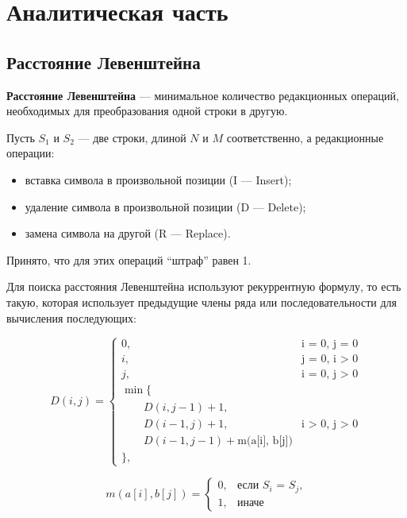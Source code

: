 \chapter{Аналитическая часть}

\section{Расстояние Левенштейна}
\textbf{Расстояние Левенштейна} --- минимальное количество редакционных операций, необходимых для преобразования одной строки в другую.\newline

Пусть $S_{1}$ и $S_{2}$ --- две строки, длиной $N$ и $M$ соответственно, а редакционные операции: %
\begin{itemize}
        \item вставка символа в произвольной позиции (I --- Insert);
        \item удаление символа в произвольной позиции (D --- Delete);
        \item замена символа на другой (R --- Replace). \newline
\end{itemize} 

Принято, что для этих операций ``штраф'' равен 1. \newline

Для поиска расстояния Левенштейна используют рекуррентную формулу, то есть такую, которая использует предыдущие члены ряда или последовательности для вычисления последующих:


\begin{equation}
	\label{eq:Lev}
	D(i, j) = \begin{cases}
		
		0, &\text{i = 0, j = 0}\\
		i, &\text{j = 0, i > 0}\\
		j, &\text{i = 0, j > 0}\\
		\min \lbrace \\
		\qquad D(i, j-1) + 1,\\
		\qquad D(i-1, j) + 1, &\text{i > 0, j > 0}\\
		\qquad D(i-1, j-1) + \text{m(a[i], b[j])}\\
		\rbrace,
	\end{cases}
\end{equation}


\begin{equation}
	\label{eq:label}
	m(a[i], b[j]) = \begin{cases}
		0, &\text{если $S_{i}$ = $S_{j}$,}\\
        1, &\text{иначе}
    \end{cases}
\end{equation}

